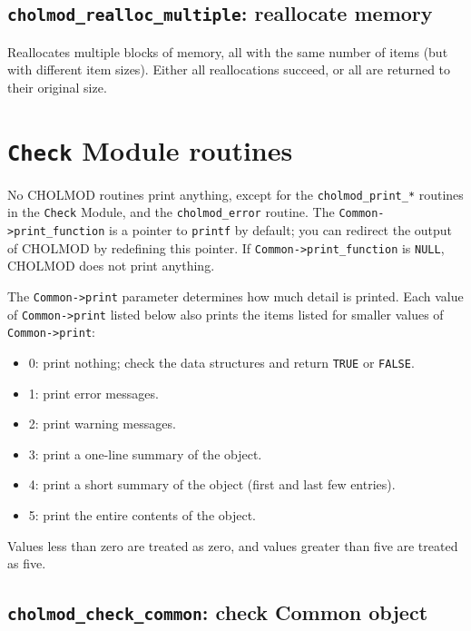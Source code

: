 \documentclass[11pt]{article}
\begin{document}
\newpage \subsection{{\tt cholmod\_realloc\_multiple}: reallocate memory}


Reallocates multiple blocks of memory, all with the same number of items
(but with different item sizes).  Either all reallocations succeed,
or all are returned to their original size.

\newpage \section{{\tt Check} Module routines}

No CHOLMOD routines print anything, except for the {\tt cholmod\_print\_*}
routines in the {\tt Check} Module, and the {\tt cholmod\_error} routine.  The
{\tt Common->print\_function} is a pointer to {\tt printf} by default;
you can redirect the output of CHOLMOD by redefining this pointer.
If {\tt Common->print\_function} is {\tt NULL}, CHOLMOD does not print anything.

The {\tt Common->print} parameter determines how much detail is printed.
Each value of {\tt Common->print} listed below also prints the items listed
for smaller values of {\tt Common->print}:
\begin{itemize}
\item 0: print nothing; check the data structures and return {\tt TRUE} or {\tt FALSE}.
\item 1: print error messages.
\item 2: print warning messages.
\item 3: print a one-line summary of the object.
\item 4: print a short summary of the object (first and last few entries).
\item 5: print the entire contents of the object.
\end{itemize}
Values less than zero are treated as zero, and values greater than five are
treated as five.

\subsection{{\tt cholmod\_check\_common}: check Common object}
\end{document}
